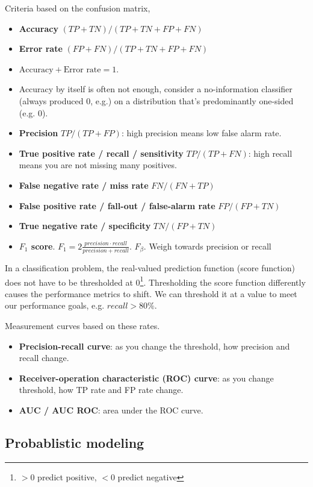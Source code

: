 \documentclass{article}
\begin{document}
Criteria based on the confusion matrix,
\begin{itemize}
\item \textbf{Accuracy} $(TP + TN) / (TP + TN + FP + FN)$
\item \textbf{Error rate} $(FP + FN) / (TP + TN + FP + FN)$
\item $\text{Accuracy} + \text{Error rate} = 1$.
\item Accuracy by itself is often not enough, consider a no-information classifier (always produced 0, e.g.) on a distribution that's predominantly one-sided (e.g. 0).
\item \textbf{Precision} $TP / (TP + FP)$: high precision means low false alarm rate.
\item \textbf{True positive rate / recall / sensitivity} $TP / (TP + FN)$: high recall means you are not missing many positives.
\item \textbf{False negative rate / miss rate} $FN / (FN + TP)$
\item \textbf{False positive rate / fall-out / false-alarm rate} $FP / (FP + TN)$
\item \textbf{True negative rate / specificity} $TN / (FP + TN)$
\item \textbf{$F_1$ score}. $F_1 = 2 \frac{precision \cdot recall}{precision + recall}$. $F_{\beta}$. Weigh towards precision or recall
\end{itemize}

In a classification problem, the real-valued prediction function (score function) does not have to be thresholded at 0\footnote{$> 0$ predict positive, $< 0$ predict negative}.
Thresholding the score function differently causes the performance metrics to shift.
We can threshold it at a value to meet our performance goals, e.g. $recall > 80\%$.

Measurement curves based on these rates.
\begin{itemize}
\item \textbf{Precision-recall curve}: as you change the threshold, how precision and recall change.
\item \textbf{Receiver-operation characteristic (ROC) curve}: as you change threshold, how TP rate and FP rate change.
\item \textbf{AUC / AUC ROC}: area under the ROC curve.
\end{itemize}

\subsection{Probablistic modeling}
\end{document}
